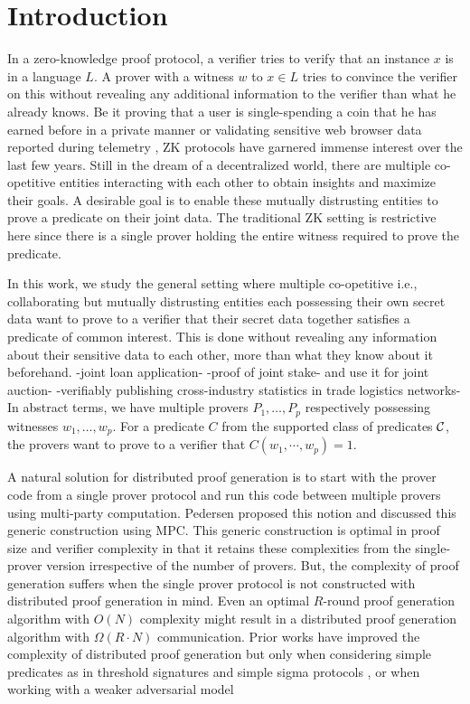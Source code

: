 \section{Introduction} \label{sec:intro}
In a zero-knowledge proof protocol, a verifier tries to verify that an instance $x$ is in a language $L$. A prover with a witness $w$ to $x \in L$ tries to convince the verifier on this without revealing any additional information to the verifier than what he already knows. Be it proving that a user is single-spending a coin that he has earned before in a private manner \cite{zerocash} or validating sensitive web browser data reported during telemetry \cite{MozillaPrio}, ZK protocols have garnered immense interest over the last few years. Still in the dream of a decentralized world, there are multiple co-opetitive entities interacting with each other to obtain insights and maximize their goals. A desirable goal is to enable these mutually distrusting entities to prove a predicate on their joint data. The traditional ZK setting is restrictive here since there is a single prover holding the entire witness required to prove the predicate. 

In this work, we study the general setting where multiple co-opetitive i.e., collaborating but mutually distrusting entities each possessing their own secret data want to prove to a verifier that their secret data together satisfies a predicate of common interest. This is done without revealing any information about their sensitive data to each other, more than what they know about it beforehand. 
-joint loan application-
-proof of joint stake- and use it for joint auction-
-verifiably publishing cross-industry statistics in trade logistics networks-
In abstract terms, we have multiple provers $P_1, \ldots, P_p$ respectively possessing witnesses $w_1, \ldots, w_p$. For a predicate $C$ from the supported class of predicates ${\cal C}$, the provers want to prove to a verifier that $C(w_1,\cdots,w_p) = 1$.

A natural solution for distributed proof generation is to start with the prover code from a single prover protocol and run this code between multiple provers using multi-party computation. Pedersen \cite{Ped92} proposed this notion and discussed this generic construction using MPC.
This generic construction is optimal in proof size and verifier complexity in that it retains these complexities from the single-prover version irrespective of the number of provers. But, the complexity of proof generation suffers when the single prover protocol is not constructed with distributed proof generation in mind. Even an optimal $R$-round proof generation algorithm with $O(N)$ complexity might result in a distributed proof generation algorithm with $\Omega(R \cdot N)$ communication.
Prior works have improved the complexity of distributed proof generation but only when considering simple predicates as in threshold signatures \cite{DDS} and simple sigma protocols \cite{EfficientTZ}, or when working with a weaker adversarial model \cite{trinocchio}

